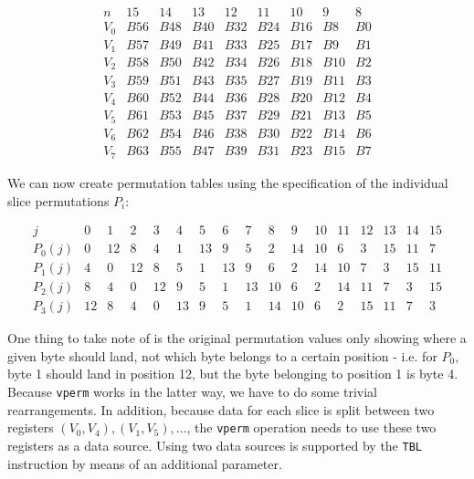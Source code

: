 \documentclass[12pt]{report}
\begin{document}
\[
    \begin{array}{c|llllllll}
        n & 15 & 14 & 13 & 12 & 11 & 10 & 9 & 8 \\
        \hline
        V_0 & B56 & B48 & B40 & B32 & B24 & B16 & B8 & B0 \\
        V_1 & B57 & B49 & B41 & B33 & B25 & B17 & B9 & B1 \\
        V_2 & B58 & B50 & B42 & B34 & B26 & B18 & B10 & B2 \\
        V_3 & B59 & B51 & B43 & B35 & B27 & B19 & B11 & B3 \\
        V_4 & B60 & B52 & B44 & B36 & B28 & B20 & B12 & B4 \\
        V_5 & B61 & B53 & B45 & B37 & B29 & B21 & B13 & B5 \\
        V_6 & B62 & B54 & B46 & B38 & B30 & B22 & B14 & B6 \\
        V_7 & B63 & B55 & B47 & B39 & B31 & B23 & B15 & B7
    \end{array}
\]

We can now create permutation tables using the specification of the individual
slice permutations $P_i$:

\[
    \begin{array}{c|llllllllllllllll}
        j & 0 & 1 & 2 & 3 & 4 & 5 & 6 & 7 & 8 & 9 & 10 & 11 & 12 & 13 & 14 & 15 \\
        \hline
        P_0(j) & 0 & 12 & 8 & 4 & 1 & 13 & 9 & 5 & 2 & 14 & 10 & 6 & 3 & 15 & 11 & 7 \\
        P_1(j) & 4 & 0 & 12 & 8 & 5 & 1 & 13 & 9 & 6 & 2 & 14 & 10 & 7 & 3 & 15 & 11 \\
        P_2(j) & 8 & 4 & 0 & 12 & 9 & 5 & 1 & 13 & 10 & 6 & 2 & 14 & 11 & 7 & 3 & 15 \\
        P_3(j) & 12 & 8 & 4 & 0 & 13 & 9 & 5 & 1 & 14 & 10 & 6 & 2 & 15 & 11 & 7 & 3
    \end{array}
\]

One thing to take note of is the original permutation values only showing where
a given byte should land, not which byte belongs to a certain position - i.e.
for $P_0$, byte 1 should land in position 12, but the byte belonging to
position 1 is byte 4. Because \texttt{vperm} works in the latter way, we have
to do some trivial rearrangements. In addition, because data for each slice is
split between two registers $(V_0,V_4),(V_1,V_5),\dots$, the \texttt{vperm}
operation needs to use these two registers as a data source. Using two data
sources is supported by the \texttt{TBL} instruction by means of an additional
parameter.
\end{document}
